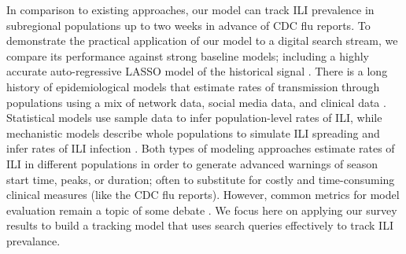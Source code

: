 \documentclass[fleqn,10pt]{wlscirep}
\providecommand{\DIFadd}[1]{{\protect\color{blue}\uwave{#1}}} %
\providecommand{\DIFaddbegin}{} %
\providecommand{\DIFaddend}{} %
\begin{document}
In comparison to existing approaches, our model can track ILI prevalence in subregional populations up to two weeks in advance of CDC flu reports. To demonstrate the practical application of our model to a digital search stream, we compare its performance against strong baseline models; including a highly accurate auto-regressive LASSO model of the historical signal \cite{yang_etal_2015}. There is a long history of epidemiological models that estimate rates of transmission through populations using a mix of network data, social media data, and clinical data \cite{ginsberg_etal_2009,culotta2010towards,bodnar2013validating,nsoesie2014guess,generous2014global,yang_etal_2015inference,yang_etal_2015,biggerstaff_etal_2016,zhang2017forecasting}. Statistical models use sample data to infer population-level rates of ILI, while mechanistic models describe whole populations to simulate ILI spreading and infer rates of ILI infection \cite{biggerstaff_etal_2016}. Both types of modeling approaches estimate rates of ILI in different populations in order to generate advanced warnings of season start time, peaks, or duration; often to substitute for costly and time-consuming clinical measures (like the CDC flu reports). However, common metrics for model evaluation remain a topic of some debate \cite{biggerstaff_etal_2016}. We focus here on applying our survey results to build a tracking model that uses search queries effectively to track ILI prevalance. 

\DIFaddbegin \section*{\DIFadd{Results}}
\DIFaddend 
\end{document}
